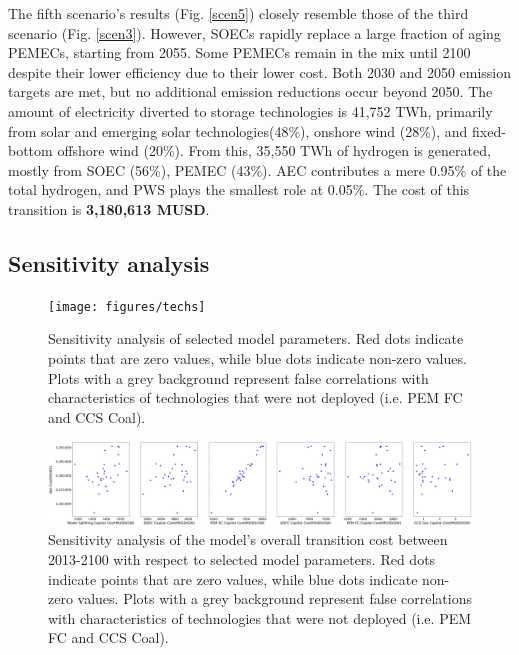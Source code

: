 The fifth scenario's results (Fig. \ref{scen5}) closely resemble those of the third scenario (Fig. \ref{scen3}). However, \gls{SOEC}s rapidly replace a large fraction of aging \gls{PEMEC}s, starting from 2055. Some \gls{PEMEC}s remain in the mix until 2100 despite their lower efficiency due to their lower cost. Both 2030 and 2050 emission targets are met, but no additional emission reductions occur beyond 2050. The amount of electricity diverted to storage technologies is 41,752 TWh, primarily from solar and emerging solar technologies(48\%), onshore wind (28\%), and fixed-bottom offshore wind (20\%). From this, 35,550 TWh of hydrogen is generated, mostly from \gls{SOEC} (56\%), \gls{PEMEC} (43\%). \gls{AEC} contributes a mere 0.95\% of the total hydrogen, and \gls{PWS} plays the smallest role at 0.05\%. The cost of this transition is \textbf{3,180,613 MUSD}.

\subsection{Sensitivity analysis}

\begin{figure}[h] 
\centering
\hspace*{-3cm}
\texttt{[image: figures/techs]}
\caption{Sensitivity analysis of selected model parameters. Red dots indicate points that are zero values, while blue dots indicate non-zero values. Plots with a grey background represent false correlations with characteristics of technologies that were not deployed (i.e. PEM FC and CCS Coal). }
\label{sa-techs}
\end{figure}

\begin{figure}[h] 
\centering
\hspace*{-3cm}
\includegraphics[scale=0.14]{figures/syscost}
\caption{Sensitivity analysis of the model's overall transition cost between 2013-2100 with respect to selected model parameters.  Red dots indicate points that are zero values, while blue dots indicate non-zero values. Plots with a grey background represent false correlations with characteristics of technologies that were not deployed (i.e. PEM FC and CCS Coal).}
\label{sa-syscost}
\end{figure}

